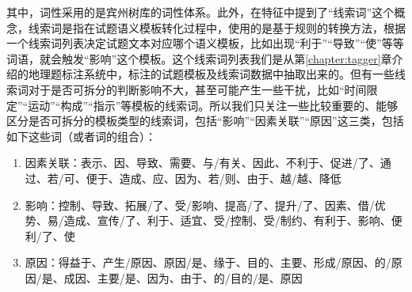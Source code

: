 \documentclass[master, winfont]{njuthesis}
\begin{document}
其中，词性采用的是宾州树库的词性体系。此外，在特征中提到了“线索词”这个概念，线索词是指在试题语义模板转化过程中，使用的是基于规则的转换方法，根据一个线索词列表决定试题文本对应哪个语义模板，比如出现“利于”“导致”“使”等等词语，就会触发“影响”这个模板。这个线索词列表我们是从第\ref{chapter:tagger}章介绍的地理题标注系统中，标注的试题模板及线索词数据中抽取出来的。但有一些线索词对于是否可拆分的判断影响不大，甚至可能产生一些干扰，比如“时间限定”“运动”“构成”“指示”等模板的线索词。所以我们只关注一些比较重要的、能够区分是否可拆分的模板类型的线索词，包括“影响”“因素关联”“原因”这三类，包括如下这些词（或者词的组合）：
\begin{enumerate}
	\item 因素关联：表示、因、导致、需要、与/有关、因此、不利于、促进/了、通过、若/可、便于、造成、应、因为、若/则、由于、越/越、降低
	\item 影响：控制、导致、拓展/了、受/影响、提高/了、提升/了、因素、借/优势、易/造成、宣传/了、利于、适宜、受/控制、受/制约、有利于、影响、便利/了、使
	\item 原因：得益于、产生/原因、原因/是、缘于、目的、主要、形成/原因、的/原因/是、成因、主要/是、因为、由于、的/目的/是、原因
\end{enumerate}
\end{document}

